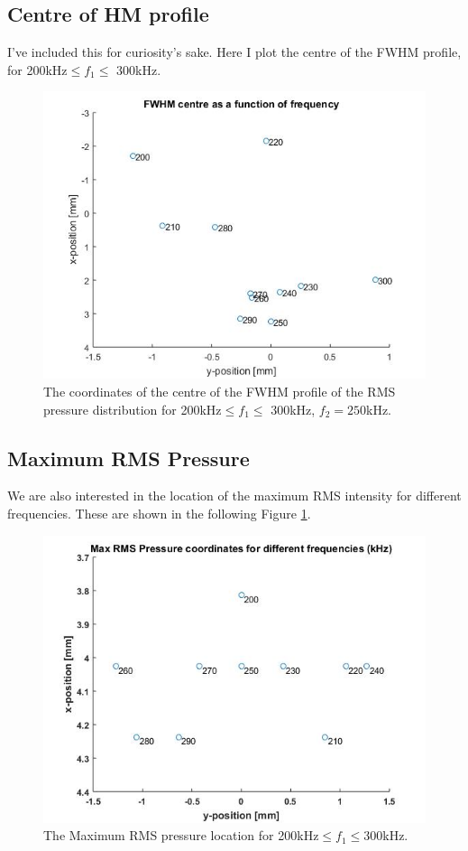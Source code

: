 \documentclass[10pt,a4paper]{article}
\begin{document}
\subsection{Centre of HM profile}

I've included this for curiosity's sake. Here I plot the centre of the FWHM profile, for 200kHz$\leq f_1 \leq$ 300kHz.
\begin{figure}[!h]
\centering
\includegraphics[scale=0.6]{FWHM_centre}
\caption{The coordinates of the centre of the FWHM profile of the RMS pressure distribution for 200kHz$\leq f_1 \leq$ 300kHz, $f_2 = 250$kHz.}
\end{figure}

\subsection{Maximum RMS Pressure}

We are also interested in the location of the maximum RMS intensity for different frequencies. These are shown in the following Figure \ref{RMS_Max}. 

\begin{figure}[!h] \label{RMS_Max}
\centering
\includegraphics[scale=0.65]{Max_RMS_pressure_coords}
\caption{The Maximum RMS pressure location for 200kHz$\leq f_1 \leq$300kHz.} 
\end{figure}
\end{document}
